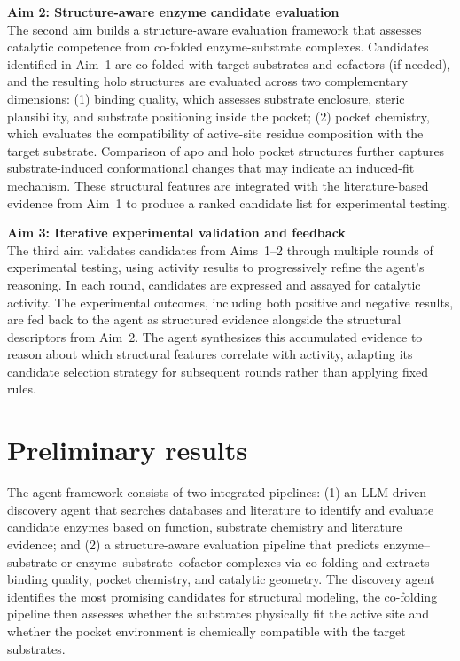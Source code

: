 \documentclass[12pt]{article}
\begin{document}
\textbf{Aim 2: Structure-aware enzyme candidate evaluation} \\
The second aim builds a structure-aware evaluation framework that assesses catalytic competence from co-folded enzyme-substrate complexes. Candidates identified in Aim~1 are co-folded with target substrates and cofactors (if needed), and the resulting holo structures are evaluated across two complementary dimensions: (1) binding quality, which assesses substrate enclosure, steric plausibility, and substrate positioning inside the pocket; (2) pocket chemistry, which evaluates the compatibility of active-site residue composition with the target substrate. Comparison of apo and holo pocket structures further captures substrate-induced conformational changes that may indicate an induced-fit mechanism. These structural features are integrated with the literature-based evidence from Aim~1 to produce a ranked candidate list for experimental testing.

\textbf{Aim 3: Iterative experimental validation and feedback} \\
The third aim validates candidates from Aims~1--2 through multiple rounds of experimental testing, using activity results to progressively refine the agent's reasoning. In each round, candidates are expressed and assayed for catalytic activity. The experimental outcomes, including both positive and negative results, are fed back to the agent as structured evidence alongside the structural descriptors from Aim~2. The agent synthesizes this accumulated evidence to reason about which structural features correlate with activity, adapting its candidate selection strategy for subsequent rounds rather than applying fixed rules.


\section{Preliminary results}
\label{sec:PreliminaryResults}

The agent framework consists of two integrated pipelines: (1) an LLM-driven discovery agent that searches databases and literature to identify and evaluate candidate enzymes based on function, substrate chemistry and literature evidence; and (2) a structure-aware evaluation pipeline that predicts enzyme--substrate or enzyme--substrate--cofactor complexes via co-folding and extracts binding quality, pocket chemistry, and catalytic geometry. The discovery agent identifies the most promising candidates for structural modeling, the co-folding pipeline then assesses whether the substrates physically fit the active site and whether the pocket environment is chemically compatible with the target substrates.
\end{document}

